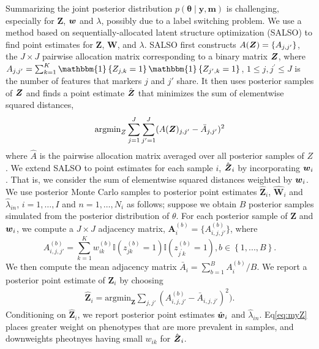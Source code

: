 \documentclass[12pt,]{article}
\newcommand{\bc}[1]{ \left\{#1\right\} }
\def\btheta{\bm{\theta}}
\def\y{\bm{y}}
\newcommand\m{\bm{m}}
\newcommand{\Ind}[1]{\mathbbm{1}\bc{#1}}
\def\Z{\bm{Z}}
\newcommand{\bZ}{\mbox{\boldmath $Z$}}
\newcommand{\bw}{\mbox{\boldmath $w$}}
\begin{document}
Summarizing the joint posterior distribution $p(\btheta \mid \y, \m)$ is
challenging, especially for $\Z$, $\bw$ and $\lambda$, possibly due to a
label switching problem.
%
We use a method based on sequentially-allocated latent structure optimization
(SALSO) \citep{salso} to find point estimates for $\Z$, $\bm W$, and $\lambda$.
SALSO first constructs $A(\bZ)=\{A_{j,j'}\}$, the $J \times J$ pairwise allocation matrix corresponding to a binary matrix
$\bZ$, where  $A_{j,j'} = \sum_{k=1}^K \Ind{Z_{j,k}=1}\Ind{Z_{j',k}=1}$, $1\leq j, j^\prime \leq J$ is the number of features that markers $j$ and $j'$ share. It then uses posterior samples of $\bZ$ and finds a point estimate $\hat{\bZ}$ that minimizes the sum of elementwise squared distances, 
%
\begin{eqnarray*}
\text{argmin}_Z\sum_{j=1}^J\sum_{j'=1}^J(A(\bZ)_{j,j'} - \bar{A}_{j,j'})^2
\label{eq:salso}
\end{eqnarray*}
%
where $\hat A$ is the pairwise allocation matrix averaged over all posterior
samples of $Z$. %
%
We extend SALSO to point estimates for each sample $i$, $\hat{\bZ}_i$ by incorporating $\bw_i$. That is, we consider the sum of elementwise squared distances weighted by $\bw_i$.  We use posterior Monte Carlo samples to posterior point estimates $\hat{\Z}_i$, $\hat{\bm W}_i$ and $\hat{\lambda}_{in}$, $i=1, \ldots, I$ and $n=1, \ldots, N_i$ as follows; suppose we obtain \(B\) posterior samples simulated from the posterior
distribution of \(\theta\). For each posterior sample of \(\Z\) and \(\bw_i\), we compute a $J \times J$ adjacency matrix, \(\bm A_i^{(b)}
=\{A^{(b)}_{i,j,j'}\}\), where 
\[
A^{(b)}_{i,j,j'} = \sum_{k=1}^K w^{(b)}_{ik} 
\mathbb{I}\left( z^{(b)}_{jk} = 1\right)
\mathbb{I}\left(z^{(b)}_{j^\prime k} = 1\right), b \in \bc{1,...,B}.
\]
We then compute the mean adjacency matrix \(\bar A_i = \sum_{b=1}^B A_i^{(b)} /
B\).  We report a posterior point estimate of $\Z_i$ by choosing
\begin{eqnarray}
\hat{\bm Z}_i = \text{argmin}_{\bm Z} \sum_{j,j'} (A_{i,j,j'}^{(b)} - \bar A_{i,j,j'})^2).\label{eq:myZ}
\end{eqnarray}
Conditioning on $\hat{\Z}_i$, we report posterior point estimates $\hat{\bw}_i$ and $\hat{\lambda}_{in}$. %
Eq\eqref{eq:myZ} places greater weight on phenotypes that are more prevalent in samples, and downweights pheotnyes having small $w_{ik}$ for $\hat{\bZ}_i$.
\end{document}
